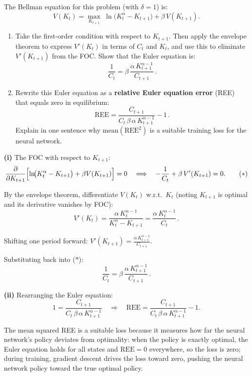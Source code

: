 \documentclass[11pt,a4paper]{article}
\begin{document}
The Bellman equation for this problem (with $\delta=1$) is:
\[
V(K_t) = \max_{K_{t+1}} \;\ln\!\bigl(K_t^{\alpha} - K_{t+1}\bigr) + \beta\, V(K_{t+1}).
\]

\begin{enumerate}[label=(\roman*),nosep]
\item Take the first-order condition with respect to $K_{t+1}$.  Then apply the envelope theorem to express $V'(K_t)$ in terms of $C_t$ and $K_t$, and use this to eliminate $V'(K_{t+1})$ from the FOC.  Show that the Euler equation is:
\[
\frac{1}{C_t} = \beta\,\frac{\alpha\, K_{t+1}^{\alpha-1}}{C_{t+1}}\,.
\]
\item Rewrite this Euler equation as a \textbf{relative Euler equation error} (REE) that equals zero in equilibrium:
\[
\text{REE} = \frac{C_{t+1}}{C_t\,\beta\,\alpha\, K_{t+1}^{\alpha-1}} - 1\,.
\]
Explain in one sentence why $\text{mean}(\text{REE}^2)$ is a suitable training loss for the neural network.
\end{enumerate}

\begin{solution}
\textbf{(i)} The FOC with respect to $K_{t+1}$:
\[
\frac{\partial}{\partial K_{t+1}}\Bigl[\ln\!\bigl(K_t^{\alpha}-K_{t+1}\bigr) + \beta V(K_{t+1})\Bigr] = 0 \quad\Longrightarrow\quad -\frac{1}{C_t} + \beta\,V'(K_{t+1}) = 0.\tag{$*$}
\]

By the envelope theorem, differentiate $V(K_t)$ w.r.t.\ $K_t$ (noting $K_{t+1}$ is optimal and its derivative vanishes by FOC):
\[
V'(K_t) = \frac{\alpha\,K_t^{\alpha-1}}{K_t^{\alpha}-K_{t+1}} = \frac{\alpha\,K_t^{\alpha-1}}{C_t}\,.
\]

Shifting one period forward: $V'(K_{t+1}) = \frac{\alpha\,K_{t+1}^{\alpha-1}}{C_{t+1}}$.

Substituting back into ($*$):
\[
\frac{1}{C_t} = \beta\,\frac{\alpha\, K_{t+1}^{\alpha-1}}{C_{t+1}}\,.
\]

\textbf{(ii)} Rearranging the Euler equation:
\[
1 = \frac{C_{t+1}}{C_t\,\beta\,\alpha\, K_{t+1}^{\alpha-1}} \quad\Longrightarrow\quad \text{REE} = \frac{C_{t+1}}{C_t\,\beta\,\alpha\, K_{t+1}^{\alpha-1}} - 1.
\]

The mean squared REE is a suitable loss because it measures how far the neural network's policy deviates from optimality: when the policy is exactly optimal, the Euler equation holds for all states and $\text{REE}=0$ everywhere, so the loss is zero; during training, gradient descent drives the loss toward zero, pushing the neural network policy toward the true optimal policy.
\end{solution}
\end{document}
